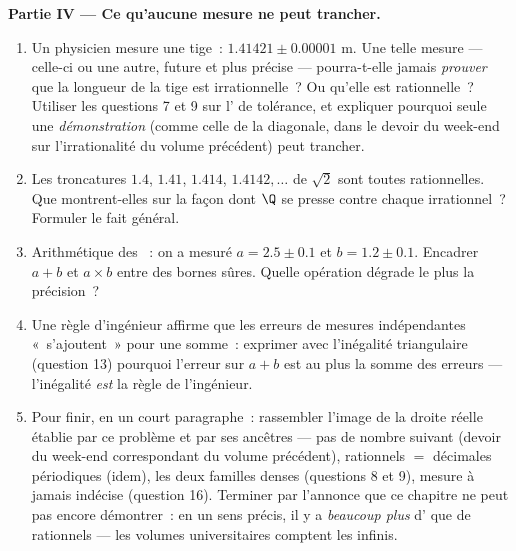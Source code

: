 \begin{problem}
\medskip
\noindent\textbf{Partie IV --- Ce qu'aucune mesure ne peut trancher.}
\begin{enumerate}[resume]
  \item Un physicien mesure une tige~: $1.41421 \pm 0.00001$ m. Une
        telle mesure --- celle-ci ou une autre, future et plus
        précise --- pourra-t-elle jamais \emph{prouver} que la
        longueur de la tige est irrationnelle~? Ou qu'elle est
        rationnelle~? Utiliser les questions 7 et 9 sur l'
        de tolérance, et expliquer pourquoi seule une
        \emph{démonstration} (comme celle de la diagonale, dans le
        devoir du week-end sur l'irrationalité du volume précédent)
        peut trancher.
  \item Les troncatures $1.4$, $1.41$, $1.414$, $1.4142,\dots$ de
        $\sqrt2$ sont toutes rationnelles. Que montrent-elles sur la
        façon dont $\Q$ se presse contre chaque irrationnel~?
        Formuler le fait général.
  \item Arithmétique des ~: on a mesuré $a = 2.5 \pm 0.1$
        et $b = 1.2 \pm 0.1$. Encadrer $a + b$ et $a \times b$ entre
        des bornes sûres. Quelle opération dégrade le plus la
        précision~?
  \item Une règle d'ingénieur affirme que les erreurs de mesures
        indépendantes «~s'ajoutent~» pour une somme~: exprimer avec
        l'inégalité triangulaire (question 13) pourquoi l'erreur sur
        $a + b$ est au plus la somme des erreurs --- l'inégalité
        \emph{est} la règle de l'ingénieur.
  \item Pour finir, en un court paragraphe~: rassembler l'image de la
        droite réelle établie par ce problème et par ses ancêtres ---
        pas de nombre suivant (devoir du week-end correspondant du
        volume précédent), rationnels $=$ décimales périodiques
        (idem), les deux familles denses (questions 8 et 9), mesure
        à jamais indécise (question 16). Terminer par l'annonce que
        ce chapitre ne peut pas encore démontrer~: en un sens précis,
        il y a \emph{beaucoup plus} d' que de rationnels
        --- les volumes universitaires comptent les infinis.
\end{enumerate}
\end{problem}
